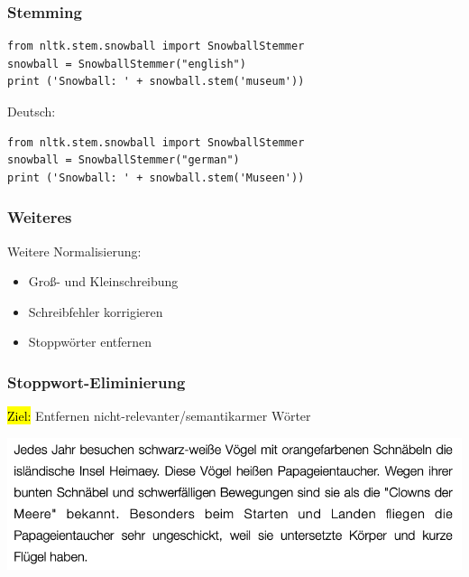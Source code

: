     
\begin{frame}[fragile]
    \frametitle{Stemming}

    \begin{verbatim}
from nltk.stem.snowball import SnowballStemmer
snowball = SnowballStemmer("english")
print ('Snowball: ' + snowball.stem('museum'))
    \end{verbatim}

    Deutsch:
    \begin{verbatim}
from nltk.stem.snowball import SnowballStemmer
snowball = SnowballStemmer("german")
print ('Snowball: ' + snowball.stem('Museen'))
    \end{verbatim}
    \end{frame}
    
    
    \begin{frame}
    \frametitle{Weiteres}
    Weitere Normalisierung:

    \begin{itemize}
    \item Groß- und Kleinschreibung
    \item Schreibfehler korrigieren
    \item Stoppwörter entfernen
    \end{itemize}
\end{frame}
     
\begin{frame}
    \frametitle{Stoppwort-Eliminierung}

    \hl{Ziel:} Entfernen nicht-relevanter/semantikarmer Wörter

    \centering\includegraphics[width=\textwidth]{fig8/stopwords_example1}

\end{frame}
     
